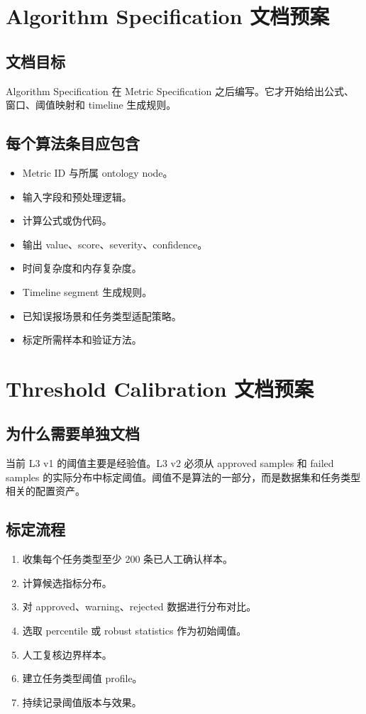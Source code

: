 \documentclass[UTF8,zihao=-4]{ctexart}
\begin{document}
\section{Algorithm Specification 文档预案}

\subsection{文档目标}

Algorithm Specification 在 Metric Specification 之后编写。它才开始给出公式、窗口、阈值映射和 timeline 生成规则。

\subsection{每个算法条目应包含}

\begin{itemize}
  \item Metric ID 与所属 ontology node。
  \item 输入字段和预处理逻辑。
  \item 计算公式或伪代码。
  \item 输出 value、score、severity、confidence。
  \item 时间复杂度和内存复杂度。
  \item Timeline segment 生成规则。
  \item 已知误报场景和任务类型适配策略。
  \item 标定所需样本和验证方法。
\end{itemize}

\section{Threshold Calibration 文档预案}

\subsection{为什么需要单独文档}

当前 L3 v1 的阈值主要是经验值。L3 v2 必须从 approved samples 和 failed samples 的实际分布中标定阈值。阈值不是算法的一部分，而是数据集和任务类型相关的配置资产。

\subsection{标定流程}

\begin{enumerate}
  \item 收集每个任务类型至少 200 条已人工确认样本。
  \item 计算候选指标分布。
  \item 对 approved、warning、rejected 数据进行分布对比。
  \item 选取 percentile 或 robust statistics 作为初始阈值。
  \item 人工复核边界样本。
  \item 建立任务类型阈值 profile。
  \item 持续记录阈值版本与效果。
\end{enumerate}
\end{document}
